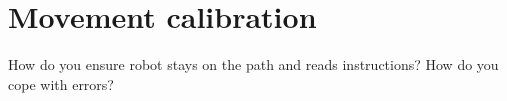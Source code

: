 \section{Movement calibration}
How do you ensure robot stays on the path and reads instructions? How do you cope with errors?
